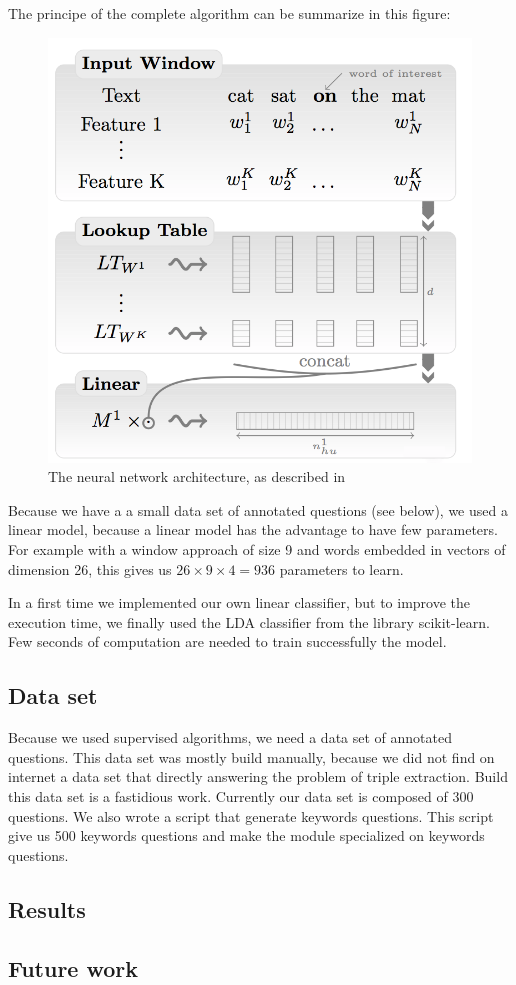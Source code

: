 The principe of the complete algorithm can be summarize in this figure: 

\begin{figure}[!ht]
  \centering
  \caption{The neural network architecture, as described in \cite{collobert}}
  \label{sandalone:tree_four}
    \includegraphics[scale=0.5]{../NLP-standalone-images/model.png}
\end{figure}

Because we have a a small data set of annotated questions (see below), we used a linear model, because  a linear model has the advantage to have few parameters.
For example with a window approach of size 9 and words embedded in vectors of dimension 26,  this gives us $26\times 9\times 4 = 936$ parameters to learn.

In a first time we implemented our own linear classifier, but to improve the execution time, we finally used the LDA classifier from the library scikit-learn. Few seconds of computation are needed to train successfully the model.

\subsection{Data set}

Because we used supervised algorithms, we need a data set of annotated questions.
This data set was mostly build manually, because we did not find on internet a data set that directly answering the problem of triple extraction.
Build this data set is a fastidious work. Currently our data set is composed of 300 questions.
We also wrote a script that generate keywords questions. This script give us 500 keywords questions and make the module specialized on keywords questions.


\subsection{Results}



\subsection{Future work}



